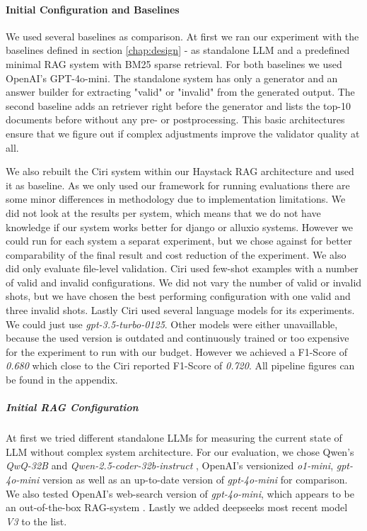 \paragraph{Initial Configuration and Baselines} \label{sec:exp_initial_config}
We used several baselines as comparison. At first we ran our experiment with the baselines defined in section \ref{chap:design} - as standalone LLM and a predefined minimal RAG system with BM25 sparse retrieval. For both baselines we used OpenAI's GPT-4o-mini\cite{OpenAI_2022}. The standalone system has only a generator and an answer builder for extracting "valid" or "invalid" from the generated output. The second baseline adds an retriever right before the generator and lists the top-10 documents before without any pre- or postprocessing. This basic architectures ensure that we figure out if complex adjustments improve the validator quality at all.

We also rebuilt the Ciri system within our Haystack RAG architecture and used it as baseline. As we only used our framework for running evaluations there are some minor differences in methodology due to implementation limitations. We did not look at the results per system, which means that we do not have knowledge if our system works better for django or alluxio systems. However we could run for each system a separat experiment, but we chose against for better comparability of the final result and cost reduction of the experiment. We also did only evaluate file-level validation. Ciri used few-shot examples with a number of valid and invalid configurations. We did not vary the number of valid or invalid shots, but we have chosen the best performing configuration with one valid and three invalid shots. Lastly Ciri used several language models for its experiments. We could just use \textit{gpt-3.5-turbo-0125}\cite{OpenAI_2022}. Other models were either unavaillable, because the used version is outdated and continuously trained or too expensive for the experiment to run with our budget. However we achieved a F1-Score of \textit{0.680} which close to the Ciri reported F1-Score of \textit{0.720}. All pipeline figures can be found in the appendix.

\subparagraph{Initial RAG Configuration} 
At first we tried different standalone LLMs for measuring the current state of LLM without complex system architecture. For our evaluation, we chose Qwen's \textit{QwQ-32B} \cite{qwq32b} and \textit{Qwen-2.5-coder-32b-instruct} \cite{hui2024qwen2}\cite{qwen2}\cite{qwen2.5}, OpenAI's versionized \textit{o1-mini}, \textit{gpt-4o-mini} version as well as an up-to-date version of \textit{gpt-4o-mini} for comparison. We also tested OpenAI's web-search version of \textit{gpt-4o-mini}, which appears to be an out-of-the-box RAG-system \cite{OpenAI_2022}. Lastly we added deepseeks most recent model \textit{V3} \cite{deepseekai2024deepseekv3technicalreport} to the list. 

